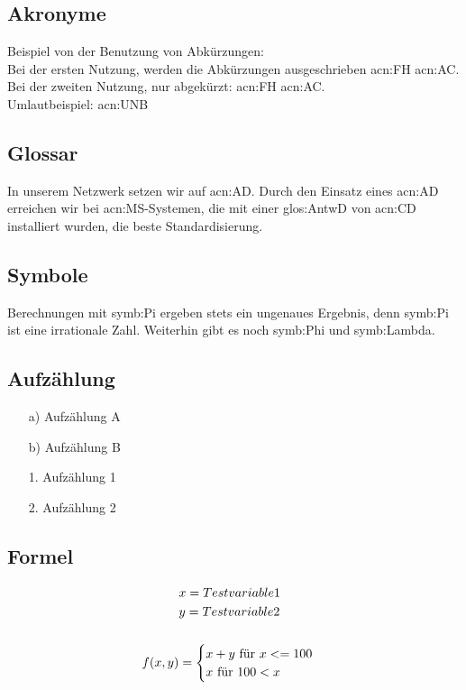 \subsection{Akronyme}
Beispiel von der Benutzung von Abkürzungen:\\
Bei der ersten Nutzung, werden die Abkürzungen ausgeschrieben \gls{acn:FH} \gls{acn:AC}.\\
Bei der zweiten Nutzung, nur abgekürzt: \gls{acn:FH} \gls{acn:AC}.\\
Umlautbeispiel: \gls{acn:UNB} \\

\subsection{Glossar}
\glqq In unserem Netzwerk setzen wir auf \gls{acn:AD}. Durch den Einsatz
eines \gls{acn:AD} erreichen wir bei \gls{acn:MS}-Systemen, die mit einer
\gls{glos:AntwD} von \gls{acn:CD} installiert wurden, die beste Standardisierung.

\subsection{Symbole}
Berechnungen mit \gls{symb:Pi} ergeben stets ein ungenaues Ergebnis,
denn \gls{symb:Pi} ist eine irrationale Zahl. Weiterhin gibt es noch
\gls{symb:Phi} und \gls{symb:Lambda}.

\subsection{Aufzählung}
\begin{itemize}
	\item[a)] Aufzählung A
	\item[b)] Aufzählung B
\end{itemize}
\begin{itemize}
	\item[1.] Aufzählung 1
	\item[2.] Aufzählung 2
\end{itemize}

\subsection{Formel}
\begin{figure}[H]
	\begin{equation}\label{eq:Example}
	\begin{split}
	&x = Testvariable 1\\
	&y = Testvariable 2\\
	\ \\
	f(x,y) &= 
	\begin{cases} 
	x + y \textnormal{ für } x <= 100 \\ 
	x \textnormal{ für } 100 < x  \\
	\end{cases}\\
	\end{split}
	\end{equation}
\end{figure}


